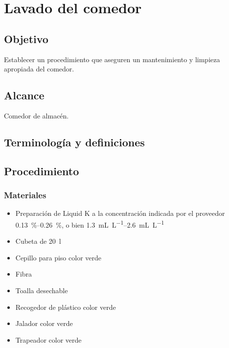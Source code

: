 \thispagestyle{formato-PI}
\renewcommand{\MenorVer}{0}
\renewcommand{\MayorVer}{2}
\renewcommand{\Codigo}{HYS-17-IT}
\renewcommand{\FechaPub}{2023--01}
\renewcommand{\Titulo}{Lavado del comedor}

\section{\Titulo}

\subsection{Objetivo}
Establecer un procedimiento que aseguren un mantenimiento y limpieza apropiada del comedor.

\subsection{Alcance}
Comedor de almacén.

\subsection{Terminología y definiciones}
\begin{description}
\end{description}



\subsection{Procedimiento}

\subsubsection{Materiales}

\begin{itemize}
	\item Preparación de Liquid K a la concentración indicada por el proveedor \qtyrange{.13}{.26}{\percent}, o bien \qtyrange{1.3}{2.6}{\milli\liter\per\liter}
	\item Cubeta de \qty{20}{\litre}
	\item Cepillo para piso color verde
	\item Fibra
	\item Toalla desechable
	\item Recogedor de plástico color verde
	\item Jalador color verde
	\item Trapeador color verde
\end{itemize}

